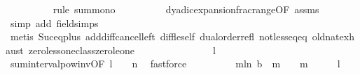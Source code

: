 \begin{isabellebody}
\ \ \ \ \ \ \ \ \isamarkupfalse%
\ {\isacharparenleft}{\kern0pt}rule\ sum{\isacharunderscore}{\kern0pt}mono{\isacharparenright}{\kern0pt}\isanewline
\ \ \ \ \ \ \ \ \isamarkupfalse%
\ dyadic{\isacharunderscore}{\kern0pt}expansion{\isacharunderscore}{\kern0pt}frac{\isacharunderscore}{\kern0pt}range{\isacharbrackleft}{\kern0pt}OF\ assms{\isacharparenleft}{\kern0pt}{}{\isacharparenright}{\kern0pt}{\isacharbrackright}{\kern0pt}\ \isamarkupfalse%
\ {\isacharparenleft}{\kern0pt}simp\ add{\isacharcolon}{\kern0pt}\ field{\isacharunderscore}{\kern0pt}simps{\isacharparenright}{\kern0pt}\isanewline
\ \ \ \ \ \ \ \ \isamarkupfalse%
\ {\isacharparenleft}{\kern0pt}metis\ Suc{\isacharunderscore}{\kern0pt}eq{\isacharunderscore}{\kern0pt}plus{}\ add{\isacharunderscore}{\kern0pt}diff{\isacharunderscore}{\kern0pt}cancel{\isacharunderscore}{\kern0pt}left{\isacharprime}{\kern0pt}\ diff{\isacharunderscore}{\kern0pt}le{\isacharunderscore}{\kern0pt}self\ dual{\isacharunderscore}{\kern0pt}order{\isachardot}{\kern0pt}refl\ not{\isacharunderscore}{\kern0pt}less{\isacharunderscore}{\kern0pt}eq{\isacharunderscore}{\kern0pt}eq\ old{\isachardot}{\kern0pt}nat{\isachardot}{\kern0pt}exhaust\ zero{\isacharunderscore}{\kern0pt}less{\isacharunderscore}{\kern0pt}one{\isacharunderscore}{\kern0pt}class{\isachardot}{\kern0pt}zero{\isacharunderscore}{\kern0pt}le{\isacharunderscore}{\kern0pt}one{\isacharparenright}{\kern0pt}\isanewline
\ \ \ \ \ \ \isamarkupfalse%
\ \isamarkupfalse%
\ {\isachardoublequoteopen}{\isachardot}{\kern0pt}{\isachardot}{\kern0pt}{\isachardot}{\kern0pt}\ {\isacharless}{\kern0pt}\ {}\ {\isacharslash}{\kern0pt}\ {}\ {\isacharcircum}{\kern0pt}\ {\isacharparenleft}{\kern0pt}l{\isacharplus}{\kern0pt}{}{\isacharparenright}{\kern0pt}{\isachardoublequoteclose}\isanewline
\ \ \ \ \ \ \ \ \isamarkupfalse%
\ sum{\isacharunderscore}{\kern0pt}interval{\isacharunderscore}{\kern0pt}pow{}{\isacharunderscore}{\kern0pt}inv{\isacharbrackleft}{\kern0pt}OF\ {\isacartoucheopen}l\ {\isacharplus}{\kern0pt}\ {}\ {\isacharless}{\kern0pt}\ n{\isacartoucheclose}{\isacharbrackright}{\kern0pt}\ \isamarkupfalse%
\ fastforce\isanewline
\ \ \ \ \ \ \isamarkupfalse%
\ \isamarkupfalse%
\ {\isachardoublequoteopen}{\isacharparenleft}{\kern0pt}{\isasymSum}m{\isasymin}{\isacharbraceleft}{\kern0pt}l{\isacharplus}{\kern0pt}{}{\isachardot}{\kern0pt}{\isachardot}{\kern0pt}n{\isacharbraceright}{\kern0pt}{\isachardot}{\kern0pt}\ {\isacharparenleft}{\kern0pt}b\ {\isacharbang}{\kern0pt}\ {\isacharparenleft}{\kern0pt}m{\isacharminus}{\kern0pt}{}{\isacharparenright}{\kern0pt}{\isacharparenright}{\kern0pt}\ {\isacharslash}{\kern0pt}\ {}\ {\isacharcircum}{\kern0pt}\ m{\isacharparenright}{\kern0pt}\ {\isacharless}{\kern0pt}\ {}\ {\isacharslash}{\kern0pt}\ {}\ {\isacharcircum}{\kern0pt}\ {\isacharparenleft}{\kern0pt}l{\isacharplus}{\kern0pt}{}{\isacharparenright}{\kern0pt}{\isachardoublequoteclose}\ \isacommand{{\isachardot}{\kern0pt}}\isamarkupfalse%

\end{isabellebody}
